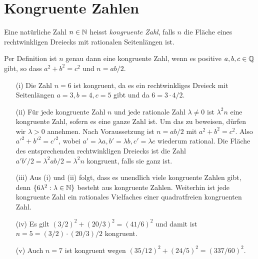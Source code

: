\chapter{Kongruente Zahlen}

\begin{definition}
  Eine natürliche Zahl $n\in{\mathbb{N}}$ heisst \emph{kongruente
    Zahl}, falls
  $n$ die Fläche eines rechtwinkligen Dreiecks mit rationalen
  Seitenlängen ist. 
\end{definition}

\begin{bemerkung}
  Per Definition ist $n$ genau dann eine kongruente Zahl, wenn es positive
  $a,b,c\in{\mathbb{Q}}$ gibt, so dass $a^2+b^2=c^2$ und $n = ab/2$. 
\end{bemerkung}

\begin{beispiele}\leavevmode
  \begin{enumerate}
  \item [(i)]
    Die Zahl $n=6$ ist kongruent, da es ein rechtwinkliges Dreieck mit Seitenlängen
    $a=3,b=4,c=5$  gibt und da $6=3\cdot 4/2$. 
  \item[(ii)]
    Für jede kongruente Zahl $n$ und jede rationale Zahl
    $\lambda\not=0$ ist $\lambda^2 n$ eine kongruente Zahl, sofern es
    eine ganze Zahl ist. Um das zu
    beweisen, dürfen wir $\lambda > 0$ annehmen. Nach Voraussetzung
    ist $n=ab/2$ mit $a^2+b^2=c^2$. Also ${a'}^2+{b'}^2={c'}^2$, wobei
    $a'=\lambda a, b'=\lambda b, c'=\lambda c$ wiederum rational.
    Die Fläche des entsprechenden rechtwinkligen Dreiecks ist die
    Zahl $a'b'/2
    = \lambda^2 ab/2 = \lambda^2 n$ kongruent, falls sie ganz ist.
  \item[(iii)]
    Aus (i) und (ii) folgt, dass es unendlich viele kongruente Zahlen
    gibt, denn $\{6\lambda^2 : \lambda\in{\mathbb{N}}\}$ besteht aus kongruente
    Zahlen.
    Weiterhin ist jede kongruente Zahl ein rationales Vielfaches
    einer quadratfreien kongruenten Zahl.

  \item[(iv)] Es gilt $(3/2)^2 +(20/3)^2 = (41/6)^2$  und damit ist
    $n=5= (3/2)\cdot(20/3)/2$ kongruent.
    
  \item[(v)] Auch $n=7$ ist kongruent wegen $(35/12)^2 +
    (24/5)^2=(337/60)^2$.

  \end{enumerate}  
\end{beispiele}

